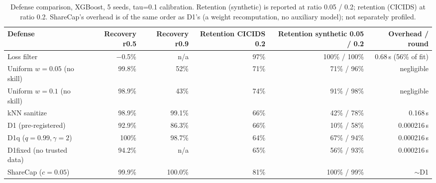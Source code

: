 \begin{table}[t]
  \centering
  \caption{Defense comparison, XGBoost, 5 seeds, tau=0.1 calibration. Retention (synthetic) is
  reported at ratio 0.05 / 0.2; retention (CICIDS) at ratio 0.2. ShareCap's overhead is of the
  same order as D1's (a weight recomputation, no auxiliary model); not separately profiled.}
  \label{tab:defense-comparison}
  \small
  \begin{tabular}{lrrrrr}
    \toprule
    Defense & Recovery r0.5 & Recovery r0.9 & Retention CICIDS 0.2 & Retention synthetic 0.05 / 0.2 & Overhead / round \\
    \midrule
    Loss filter                        & $-$0.5\% & n/a   & 97\% & 100\% / 100\% & 0.68\,s (56\% of fit) \\
    Uniform $w=0.05$ (no skill)        & 99.8\%   & 52\%  & 71\% & 71\% / 96\%   & negligible \\
    Uniform $w=0.1$ (no skill)         & 98.9\%   & 43\%  & 74\% & 91\% / 98\%   & negligible \\
    kNN sanitize                       & 98.9\%   & 99.1\% & 66\% & 42\% / 78\%  & 0.168\,s \\
    D1 (pre-registered)                & 92.9\%   & 86.3\% & 66\% & 10\% / 58\%   & 0.000216\,s \\
    D1q ($q{=}0.99,\gamma{=}2$)        & 100\%    & 98.7\% & 64\% & 67\% / 94\%   & 0.000216\,s \\
    D1fixed (no trusted data)          & 94.2\%   & n/a    & 65\% & 56\% / 93\%   & 0.000216\,s \\
    ShareCap ($c=0.05$)                & 99.9\%   & 100.0\% & 81\% & 100\% / 99\%  & $\sim$D1 \\
    \bottomrule
  \end{tabular}
\end{table}
